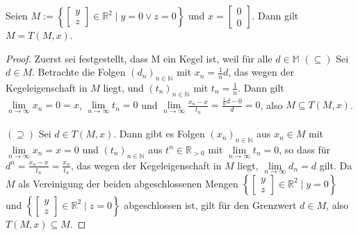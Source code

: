 
Seien $M:=\left\{\begin{bmatrix}y\\z\end{bmatrix}\in\mathbb R^2\mid y=0\lor z=0\right\}$ und $x=\begin{bmatrix}0\\0\end{bmatrix}$. Dann gilt $M=T(M,x)$.
\begin{proof}Zuerst sei festgestellt, dass M ein Kegel ist, weil für alle $d\in\mathbb M$\newline
$(\subseteq)$ Sei $d\in M$. Betrachte die Folgen $(d_n)_{n\in\mathbb N}$ mit $x_n=\frac{1}{n}d$, das wegen der Kegeleigenschaft in $M$ liegt, und $(t_n)_{n\in\mathbb N}$ mit $t_n=\frac{1}{n}$. Dann gilt $\lim\limits_{n\to\infty} x_n=0=x$, $\lim\limits_{n\to\infty} t_n=0$ und $\lim\limits_{n\to\infty} \frac{x_n-x}{t_n}=\frac{\frac{1}{n}d-0}{d}=0$, also $M\subseteq T(M,x)$.\\\\
$(\supseteq)$ Sei $d\in T(M,x)$. Dann gibt es Folgen $(x_n)_{n\in\mathbb N}$ aus $x_n\in M$ mit $\lim\limits_{n\to\infty} x_n=x=0$ und $(t_n)_{n\in\mathbb N}$ aus $t^n\in \mathbb R_{>0}$ mit $\lim\limits_{n\to\infty} t_n=0$, so dass für $d^n=\frac{x_n-x}{t_n}=\frac{x_n}{t_n}$, das wegen der Kegeleigenschaft in $M$ liegt, $\lim\limits_{n\to\infty} d_n=d$ gilt. Da $M$ als Vereinigung der beiden abgeschlossenen Mengen $\left\{\begin{bmatrix}y\\z\end{bmatrix}\in\mathbb R^2\mid y=0\right\}$ und $\left\{\begin{bmatrix}y\\z\end{bmatrix}\in\mathbb R^2\mid z=0\right\}$ abgeschlossen ist, gilt für den Grenzwert $d\in M$, also $T(M,x)\subseteq M$.
\end{proof}
